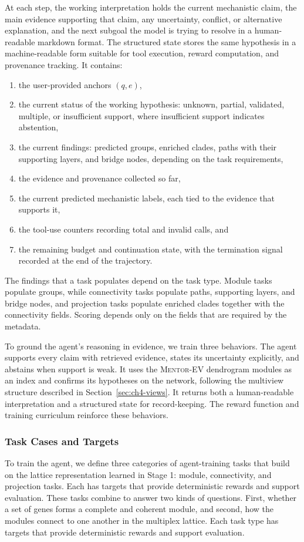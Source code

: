 \documentclass[thesis,letterpaper,12pt]{utthesis}
\begin{document}
At each step, the working interpretation holds the current mechanistic claim, the main evidence supporting that claim, any uncertainty, conflict, or alternative explanation, and the next subgoal the model is trying to resolve in a human-readable markdown format. The structured state stores the same hypothesis in a machine-readable form suitable for tool execution, reward computation, and provenance tracking. It contains:
\begin{enumerate}
    \item the user-provided anchors $(q, e)$,
    \item the current status of the working hypothesis: unknown, partial, validated, multiple, or insufficient support, where insufficient support indicates abstention,
    \item the current findings: predicted groups, enriched clades, paths with their supporting layers, and bridge nodes, depending on the task requirements,
    \item the evidence and provenance collected so far,
    \item the current predicted mechanistic labels, each tied to the evidence that supports it,
    \item the tool-use counters recording total and invalid calls, and
    \item the remaining budget and continuation state, with the termination signal recorded at the end of the trajectory.
\end{enumerate}

The findings that a task populates depend on the task type. Module tasks populate groups, while connectivity tasks populate paths, supporting layers, and bridge nodes, and projection tasks populate enriched clades together with the connectivity fields. Scoring depends only on the fields that are required by the metadata.

To ground the agent's reasoning in evidence, we train three behaviors. The agent supports every claim with retrieved evidence, states its uncertainty explicitly, and abstains when support is weak. It uses the \textsc{Mentor-EV} dendrogram modules as an index and confirms its hypotheses on the network, following the multiview structure described in Section~\ref{sec:ch4-views}. It returns both a human-readable interpretation and a structured state for record-keeping. The reward function and training curriculum reinforce these behaviors.

\subsubsection{Task Cases and Targets}\label{sec:ch4-task-cases}
To train the agent, we define three categories of agent-training tasks that build on the lattice representation learned in Stage 1: module, connectivity, and projection tasks. Each has targets that provide deterministic rewards and support evaluation. These tasks combine to answer two kinds of questions. First, whether a set of genes forms a complete and coherent module, and second, how the modules connect to one another in the multiplex lattice. Each task type has targets that provide deterministic rewards and support evaluation.
\end{document}
